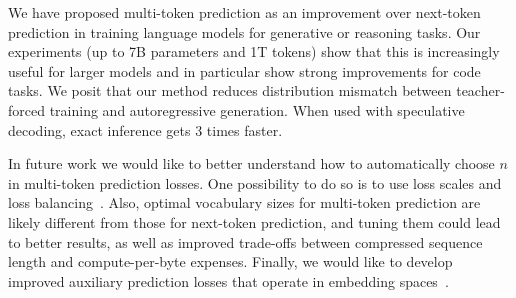 \label{sect:conclusion}





We have proposed multi-token prediction as an improvement over next-token prediction in training language models for generative or reasoning tasks. 
Our experiments (up to 7B parameters and 1T tokens) show that this is increasingly useful for larger models and in particular show strong improvements for code tasks.  
We posit that our method reduces distribution mismatch between teacher-forced training and autoregressive generation. %
When used with speculative decoding, exact inference gets 3 times faster.

In future work we would like to better understand how to automatically choose $n$ in multi-token prediction losses.
One possibility to do so is to use loss scales and loss balancing~\cite{defossez2022highfi}.
Also, optimal vocabulary sizes for multi-token prediction are likely different from those for next-token prediction, and tuning them could lead to better results, as well as improved trade-offs between compressed sequence length and compute-per-byte expenses.
Finally, we would like to develop improved auxiliary prediction losses that operate in embedding spaces~\cite{lecun2022path}.



